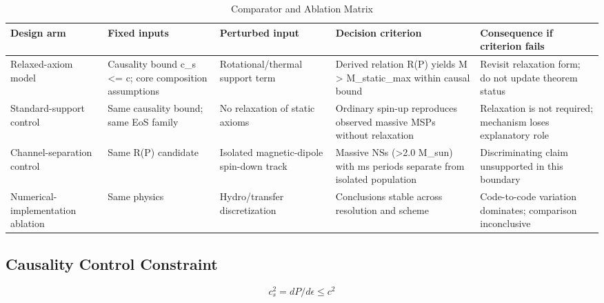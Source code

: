 \documentclass[conference]{IEEEtran}
\begin{document}
\begin{table}[htbp]
\centering
\footnotesize
\setlength{\tabcolsep}{3pt}
\renewcommand{\arraystretch}{1.12}
\caption{Comparator and Ablation Matrix}
\label{tab:study-design-and-methods-b2}
\begin{tabular}{|p{}|p{}|p{}|p{}|p{}|}
\hline
Design arm & Fixed inputs & Perturbed input & Decision criterion & Consequence if criterion fails \\\hline
Relaxed-axiom model & Causality bound c\_s <= c; core composition assumptions & Rotational/thermal support term & Derived relation R(P) yields M > M\_static\_max within causal bound & Revisit relaxation form; do not update theorem status \\\hline
Standard-support control & Same causality bound; same EoS family & No relaxation of static axioms & Ordinary spin-up reproduces observed massive MSPs without relaxation & Relaxation is not required; mechanism loses explanatory role \\\hline
Channel-separation control & Same R(P) candidate & Isolated magnetic-dipole spin-down track & Massive NSs (>2.0 M\_sun) with ms periods separate from isolated population & Discriminating claim unsupported in this boundary \\\hline
Numerical-implementation ablation & Same physics & Hydro/transfer discretization & Conclusions stable across resolution and scheme & Code-to-code variation dominates; comparison inconclusive \\\hline
\end{tabular}
\end{table}

\subsection{Causality Control Constraint}
\begin{equation}
c_s^2 = dP/d\epsilon \leq c^2
\label{eq:study-design-and-methods-b3}
\end{equation}
\end{document}
